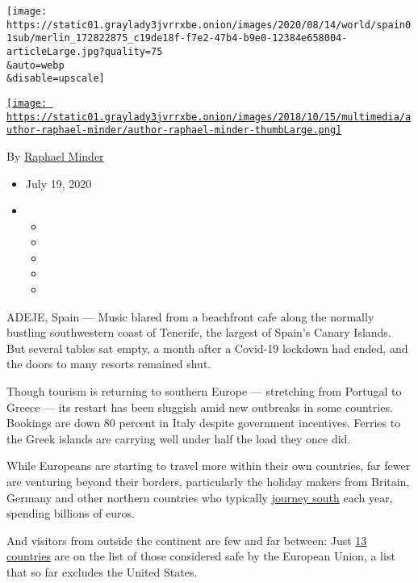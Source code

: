 \texttt{[image: https://static01.graylady3jvrrxbe.onion/images/2020/08/14/world/spain01sub/merlin\_172822875\_c19de18f-f7e2-47b4-b9e0-12384e658004-articleLarge.jpg?quality=75\\\&auto=webp\\\&disable=upscale]}

\href{https://www.nytimes3xbfgragh.onion/by/raphael-minder}{\texttt{[image: https://static01.graylady3jvrrxbe.onion/images/2018/10/15/multimedia/author-raphael-minder/author-raphael-minder-thumbLarge.png]}}

By \href{https://www.nytimes3xbfgragh.onion/by/raphael-minder}{Raphael
Minder}

\begin{itemize}
\item
  July 19, 2020
\item
  \begin{itemize}
  \item
  \item
  \item
  \item
  \item
  \end{itemize}
\end{itemize}

ADEJE, Spain --- Music blared from a beachfront cafe along the normally
bustling southwestern coast of Tenerife, the largest of Spain's Canary
Islands. But several tables sat empty, a month after a Covid-19 lockdown
had ended, and the doors to many resorts remained shut.

Though tourism is returning to southern Europe --- stretching from
Portugal to Greece --- its restart has been sluggish amid new outbreaks
in some countries. Bookings are down 80 percent in Italy despite
government incentives. Ferries to the Greek islands are carrying well
under half the load they once did.

While Europeans are starting to travel more within their own countries,
far fewer are venturing beyond their borders, particularly the holiday
makers from Britain, Germany and other northern countries who typically
\href{https://www.statista.com/topics/3848/travel-and-tourism-in-europe/}{journey
south} each year, spending billions of euros.

And visitors from outside the continent are few and far between: Just
\href{https://www.nytimes3xbfgragh.onion/reuters/2020/07/14/world/14reuters-health-coronavirus-eu-travel.html}{13
countries} are on the list of those considered safe by the European
Union, a list that so far excludes the United States.


